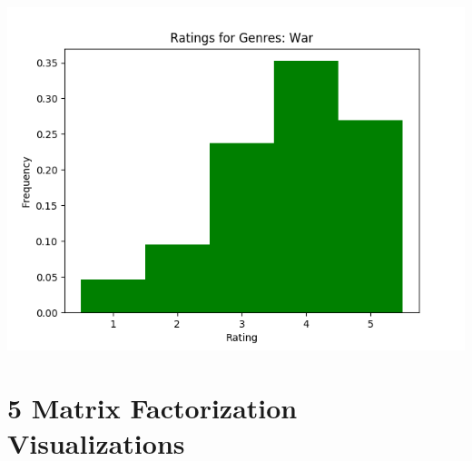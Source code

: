 \includegraphics[scale=0.5]{"Ratings for Genres: War"} \\

\section*{5 Matrix Factorization Visualizations}

